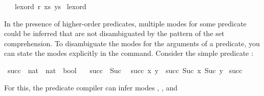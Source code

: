 \begin{isabellebody}
\ \ {}\ lexord\ r\ {}xs{}\ ys{}{}\isanewline
{}\isamarkupfalse%
\ lexord%
\endisatagquote
{\isafoldquote}%
%
\isadelimquote
%
\endisadelimquote
%
\isamarkuptrue%
%
\begin{isamarkuptext}%
In the presence of higher-order predicates, multiple modes for some
  predicate could be inferred that are not disambiguated by the
  pattern of the set comprehension.  To disambiguate the modes for the
  arguments of a predicate, you can state the modes explicitly in the
  \hyperlink{command.values}{\mbox{}} command.  Consider the simple predicate :%
\end{isamarkuptext}%
\isamarkuptrue%
%
\isadelimquote
%
\endisadelimquote
%
\isatagquote
{}\isamarkupfalse%
\ succ\ {}{}\ {}nat\ {}\ nat\ {}\ bool{}\ \isanewline
\ \ {}succ\ {}\ {}Suc\ {}{}{}\isanewline
{}\ {}succ\ x\ y\ {}\ succ\ {}Suc\ x{}\ {}Suc\ y{}{}\isanewline
\isanewline
{}\isamarkupfalse%
\ succ\ \isamarkupfalse%
%
\endisatagquote
{\isafoldquote}%
%
\isadelimquote
%
\endisadelimquote
%
\begin{isamarkuptext}%
\noindent For this, the predicate compiler can infer modes , ,  and

\end{isamarkuptext}
\end{isabellebody}
